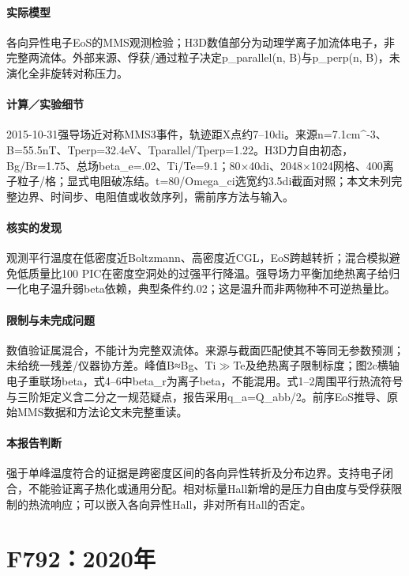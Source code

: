 \documentclass[UTF8,a4paper,11pt,openany,fontset=fandol]{ctexbook}
\begin{document}
\paragraph{实际模型}各向异性电子EoS的MMS观测检验；H3D数值部分为动理学离子加流体电子，非完整两流体。外部来源、俘获/通过粒子决定p\_parallel(n, B)与p\_perp(n, B)，未演化全非旋转对称压力。

\paragraph{计算／实验细节}2015-10-31强导场近对称MMS3事件，轨迹距X点约7–10di。来源n=7.1cm\textasciicircum{}-3、B=55.5nT、Tperp=32.4eV、Tparallel/Tperp=1.22。H3D力自由初态，Bg/Br=1.75、总场beta\_e=.02、Ti/Te=9.1；80×40di、2048×1024网格、400离子粒子/格；显式电阻破冻结。t=80/Omega\_ci选宽约3.5di截面对照；本文未列完整边界、时间步、电阻值或收敛序列，需前序方法与输入。

\paragraph{核实的发现}观测平行温度在低密度近Boltzmann、高密度近CGL，EoS跨越转折；混合模拟避免低质量比100 PIC在密度空洞处的过强平行降温。强导场力平衡加绝热离子给归一化电子温升弱beta依赖，典型条件约.02；这是温升而非两物种不可逆热量比。

\paragraph{限制与未完成问题}数值验证属混合，不能计为完整双流体。来源与截面匹配使其不等同无参数预测；未给统一残差/仪器协方差。峰值B≈Bg、Ti\ensuremath{\gg}Te及绝热离子限制标度；图2c横轴电子重联场beta，式4–6中beta\_r为离子beta，不能混用。式1–2周围平行热流符号与三阶矩定义含二分之一规范疑点，报告采用q\_a=Q\_abb/2。前序EoS推导、原始MMS数据和方法论文未完整重读。

\paragraph{本报告判断}强于单峰温度符合的证据是跨密度区间的各向异性转折及分布边界。支持电子闭合，不能验证离子热化或通用分配。相对标量Hall新增的是压力自由度与受俘获限制的热流响应；可以嵌入各向异性Hall，非对所有Hall的否定。

\section{F792：2020年}\label{paper:F792}
\end{document}
